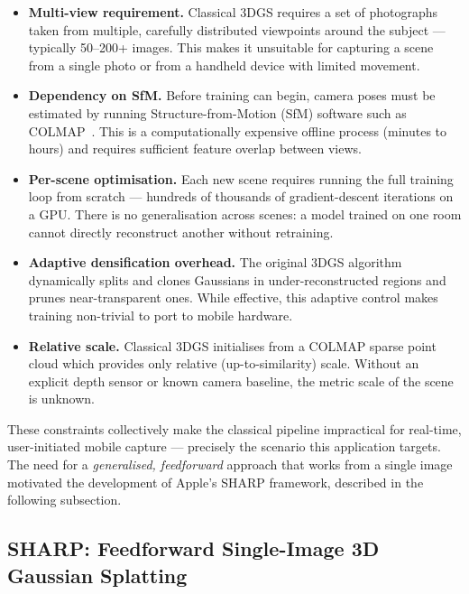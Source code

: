 \begin{itemize}
    \item \textbf{Multi-view requirement.} Classical 3DGS requires a set of photographs taken from multiple, carefully distributed viewpoints around the subject — typically 50--200+ images. This makes it unsuitable for capturing a scene from a single photo or from a handheld device with limited movement.

    \item \textbf{Dependency on SfM.} Before training can begin, camera poses must be estimated by running Structure-from-Motion (SfM) software such as COLMAP~\cite{schoenberger2016sfm}. This is a computationally expensive offline process (minutes to hours) and requires sufficient feature overlap between views.

    \item \textbf{Per-scene optimisation.} Each new scene requires running the full training loop from scratch — hundreds of thousands of gradient-descent iterations on a GPU. There is no generalisation across scenes: a model trained on one room cannot directly reconstruct another without retraining.

    \item \textbf{Adaptive densification overhead.} The original 3DGS algorithm dynamically splits and clones Gaussians in under-reconstructed regions and prunes near-transparent ones. While effective, this adaptive control makes training non-trivial to port to mobile hardware.

    \item \textbf{Relative scale.} Classical 3DGS initialises from a COLMAP sparse point cloud which provides only relative (up-to-similarity) scale. Without an explicit depth sensor or known camera baseline, the metric scale of the scene is unknown.
\end{itemize}

These constraints collectively make the classical pipeline impractical for real-time, user-initiated mobile capture — precisely the scenario this application targets. The need for a \emph{generalised, feedforward} approach that works from a single image motivated the development of Apple's SHARP framework, described in the following subsection.

\subsection{SHARP: Feedforward Single-Image 3D Gaussian Splatting}
\label{subsec:sharp}

